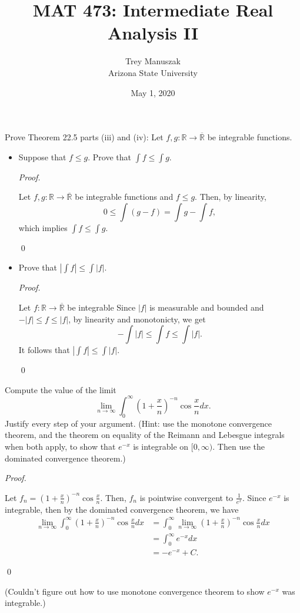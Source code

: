 \documentclass[12pt]{article}
\title{MAT 473: Intermediate Real Analysis II}
\date{May 1, 2020}
\author{Trey Manuszak\\ Arizona State University}
\newenvironment{problem}[2][Problem]{\begin{trivlist}
\item[\hskip \labelsep {\bfseries #1}\hskip \labelsep {\bfseries
#2.}]}{\end{trivlist}}
\newenvironment{sol}
    {\emph{Proof.}
    }
    {
    \qed
    }
\begin{document}


\maketitle
\newpage


\begin{problem}{49}
Prove Theorem 22.5 parts (iii) and (iv): Let $f,g : \mathbb{R} \to \overline{\mathbb{R}}$ be integrable functions.
\begin{itemize}
  \item[(iii)] Suppose that $f \leq g$. Prove that $\int f \leq \int g$.
  
  \begin{sol}
    Let $f,g : \mathbb{R} \to \overline{\mathbb{R}}$ be integrable functions and $f \leq g$. Then, by linearity, $$0 \leq \int (g - f) = \int g - \int f,$$ which implies $\int f \leq \int g$.
  \end{sol}

  \item[(iv)] Prove that $\left| \int f \right| \leq \int | f |$. 
   
  \begin{sol}
    Let $f : \mathbb{R} \to \overline{\mathbb{R}}$ be integrable Since $\left| f \right|$ is measurable and bounded and $-\left|f \right| \leq f \leq \left| f \right|$, by linearity and monotonicty, we get $$- \int \left| f \right| \leq \int f \leq \int \left| f \right|.$$ It follows that $\left| \int f \right| \leq \int | f |$.
  \end{sol} 
\end{itemize}
\end{problem}

\begin{problem}{50}
Compute the value of the limit $$\lim_{n \to \infty} \int_{0}^{\infty}\left( 1 + \frac{x}{n} \right)^{-n}\cos \frac{x}{n}dx.$$ Justify every step of your argument. (Hint: use the monotone convergence theorem, and the theorem on equality of the Reimann and Lebesgue integrals when both apply, to show that $e^{-x}$ is integrable on $[0,\infty)$. Then use the dominated convergence theorem.)
\end{problem}

\begin{sol}
  Let $f_n = \left( 1 + \frac{x}{n} \right)^{-n}\cos \frac{x}{n}$. Then, $f_n$ is pointwise convergent to $\frac{1}{e^x}$. Since $e^{-x}$ is integrable, then by the dominated convergence theorem, we have 
  \begin{align*}
    \lim_{n \to \infty} \int_{0}^{\infty}\left( 1 + \frac{x}{n} \right)^{-n}\cos \frac{x}{n}dx &= \int_{0}^{\infty} \lim_{n \to \infty} \left( 1 + \frac{x}{n} \right)^{-n}\cos \frac{x}{n}dx \\ &= \int_{0}^{\infty} e^{-x}dx \\ &= -e^{-x} + C.
  \end{align*}
\end{sol}

\noindent (Couldn't figure out how to use monotone convergence theorem to show $e^{-x}$ was integrable.)
\end{document}
